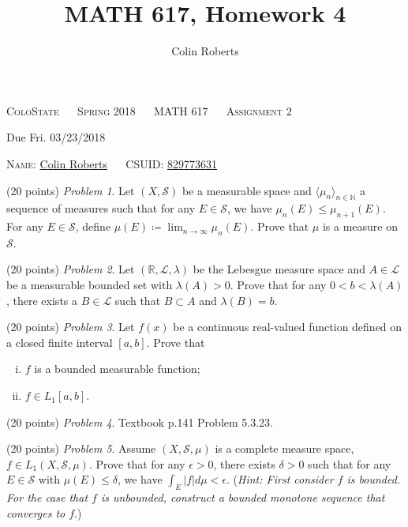 \documentclass[leqno]{article}
\author{Colin Roberts}
\title{MATH 617, Homework 4}
\theoremstyle{nonumberplain}
\newcommand{\R}{\mathbb{R}}
\newcommand{\N}{\mathbb{N}}
\newcommand{\Sets}{\mathcal{S}}
\newcommand{\Leb}{\mathcal{L}}
\begin{document}
\begin{center}
  \textsc{\large ColoState ~~ Spring 2018 ~~ MATH 617 ~~ Assignment 2}
\end{center}

\begin{center}
  \textrm{Due Fri. 03/23/2018}
\end{center}

\vglue 0.10in

\bigskip
\noindent
\textsc{Name:} \underline{Colin Roberts\hglue 1.5in} ~~
\textsc{CSUID:} \underline{829773631\hglue 1.5in}

\vskip 0.15in

\bigskip
\noindent
(20 points) \textit{Problem 1}. \quad
Let $(X,\mathcal{S})$ be a measurable space and $\langle \mu_n \rangle_{n\in \N}$ a sequence of measures such that for any $E\in \mathcal{S}$, we have $\mu_n(E)\leq \mu_{n+1} (E)$. For any $E\in \mathcal{S}$, define $\mu(E)\coloneqq \lim_{n\to \infty} \mu_n(E)$. Prove that $\mu$ is a measure on $\Sets$.

\bigskip
\bigskip
\noindent
(20 points) \textit{Problem 2}. \quad
Let $(\R,\Leb, \lambda)$ be the Lebesgue measure space and $A\in \Leb$ be a measurable bounded set with $\lambda(A)>0$. Prove that for any $0<b<\lambda(A)$, there exists a $B \in \Leb$ such that $B\subset A$ and $\lambda(B)=b$.


\bigskip
\bigskip
\noindent
(20 points) \textit{Problem 3}. \quad
Let $f(x)$ be a continuous real-valued function defined on a closed finite interval $[a,b]$. Prove that
\begin{enumerate}[(i)]
\item $f$ is a bounded measurable function;
\item $f\in L_1[a,b]$.
\end{enumerate}

\bigskip
\bigskip
\noindent
(20 points) \textit{Problem 4}. \quad
Textbook p.141 Problem 5.3.23.

\bigskip
\bigskip
\noindent
(20 points) \textit{Problem 5}. \quad
Assume $(X,\Sets,\mu)$ is a complete measure space, $f\in L_1(X,\Sets,\mu)$. Prove that for any $\epsilon>0$, there exists $\delta>0$ such that for any $E\in \Sets$ with $\mu(E)\leq \delta$, we have $\displaystyle{\int_E |f|d\mu <\epsilon}$. (\emph{Hint: First consider $f$ is bounded. For the case that $f$ is unbounded, construct a bounded monotone sequence that converges to $f$}.)
\end{document}

